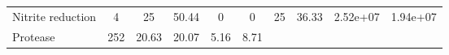 \documentclass[]{article}
\begin{document}
\begin{longtable}[]{@{}lccccccccc@{}}
\begin{minipage}[t]{0.07\columnwidth}
Nitrite reduction\strut
\end{minipage} & \begin{minipage}[t]{0.06\columnwidth}\centering\strut
4\strut
\end{minipage} & \begin{minipage}[t]{0.08\columnwidth}\centering\strut
25\strut
\end{minipage} & \begin{minipage}[t]{0.08\columnwidth}\centering\strut
50.44\strut
\end{minipage} & \begin{minipage}[t]{0.08\columnwidth}\centering\strut
0\strut
\end{minipage} & \begin{minipage}[t]{0.08\columnwidth}\centering\strut
0\strut
\end{minipage} & \begin{minipage}[t]{0.08\columnwidth}\centering\strut
25\strut
\end{minipage} & \begin{minipage}[t]{0.08\columnwidth}\centering\strut
36.33\strut
\end{minipage} & \begin{minipage}[t]{0.08\columnwidth}\centering\strut
2.52e+07\strut
\end{minipage} & \begin{minipage}[t]{0.08\columnwidth}\centering\strut
1.94e+07\strut
\end{minipage}\tabularnewline
\begin{minipage}[t]{0.07\columnwidth}\raggedright\strut
Protease\strut
\end{minipage} & \begin{minipage}[t]{0.06\columnwidth}\centering\strut
252\strut
\end{minipage} & \begin{minipage}[t]{0.08\columnwidth}\centering\strut
20.63\strut
\end{minipage} & \begin{minipage}[t]{0.08\columnwidth}\centering\strut
20.07\strut
\end{minipage} & \begin{minipage}[t]{0.08\columnwidth}\centering\strut
5.16\strut
\end{minipage} & \begin{minipage}[t]{0.08\columnwidth}\centering\strut
8.71\strut
\end{minipage} & \begin{minipage}[t]{0.08\columnwidth}\centering\strut

\end{minipage}
\end{longtable}
\end{document}
